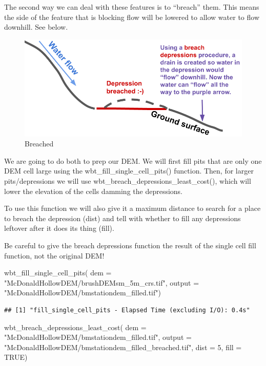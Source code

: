 \documentclass[
]{book}
\newenvironment{Shaded}{\begin{snugshade}}{\end{snugshade}}
\newcommand{\AttributeTok}[1]{\textcolor[rgb]{0.77,0.63,0.00}{#1}}
\newcommand{\ConstantTok}[1]{\textcolor[rgb]{0.00,0.00,0.00}{#1}}
\newcommand{\DecValTok}[1]{\textcolor[rgb]{0.00,0.00,0.81}{#1}}
\newcommand{\FunctionTok}[1]{\textcolor[rgb]{0.00,0.00,0.00}{#1}}
\newcommand{\NormalTok}[1]{#1}
\newcommand{\StringTok}[1]{\textcolor[rgb]{0.31,0.60,0.02}{#1}}
\begin{document}
The second way we can deal with these features is to ``breach'' them. This means the side of the feature that is blocking flow will be lowered to allow water to flow downhill. See below.

\begin{figure}
\centering
\includegraphics{images/breached.png}
\caption{Breached}
\end{figure}

We are going to do both to prep our DEM. We will first fill pits that are only one DEM cell large using the wbt\_fill\_single\_cell\_pits() function. Then, for larger pits/depressions we will use wbt\_breach\_depressions\_least\_cost(), which will lower the elevation of the cells damming the depressions.

To use this function we will also give it a maximum distance to search for a place to breach the depression (dist) and tell with whether to fill any depressions leftover after it does its thing (fill).

Be careful to give the breach depressions function the result of the single cell fill function, not the original DEM!

\begin{Shaded}
\begin{Highlighting}[]
\FunctionTok{wbt\_fill\_single\_cell\_pits}\NormalTok{(}
                    \AttributeTok{dem =} \StringTok{"McDonaldHollowDEM/brushDEMsm\_5m\_crs.tif"}\NormalTok{,}
                    \AttributeTok{output =} \StringTok{"McDonaldHollowDEM/bmstationdem\_filled.tif"}\NormalTok{)}
\end{Highlighting}
\end{Shaded}

\begin{verbatim}
## [1] "fill_single_cell_pits - Elapsed Time (excluding I/O): 0.4s"
\end{verbatim}

\begin{Shaded}
\begin{Highlighting}[]
\FunctionTok{wbt\_breach\_depressions\_least\_cost}\NormalTok{(}
                     \AttributeTok{dem =} \StringTok{"McDonaldHollowDEM/bmstationdem\_filled.tif"}\NormalTok{,}
                     \AttributeTok{output =} \StringTok{"McDonaldHollowDEM/bmstationdem\_filled\_breached.tif"}\NormalTok{,}
                     \AttributeTok{dist =} \DecValTok{5}\NormalTok{,}
                     \AttributeTok{fill =} \ConstantTok{TRUE}\NormalTok{)}
\end{Highlighting}
\end{Shaded}
\end{document}
